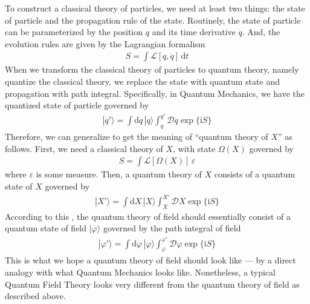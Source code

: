 \documentclass[letterpaper,10pt,english]{sphinxmanual}
\begin{document}
To construct a classical theory of particles, we need at least two things: the state of particle and the propagation rule of the state. Routinely, the state of particle can be parameterized by the position \(q\) and its time derivative \(\dot{q}\). And, the evolution rules are given by the Lagrangian formalism
\begin{equation*}
\begin{split}S = \int \mathcal{L}[q,\dot{q}]\,\mathrm{d}t\end{split}
\end{equation*}
When we transform the classical theory of particles to quantum theory, namely quantize the classical theory, we replace the state with quantum state and propagation with path integral. Specifically, in Quantum Mechanics, we have the quantized state of particle governed by
\begin{equation*}
\begin{split}|q'\rangle = \int\mathrm{d}q\,|q\rangle \int_q^{q'}\mathcal{D}q\exp\{\mathrm{i}S\}\end{split}
\end{equation*}
Therefore, we can generalize to get the meaning of ``quantum theory of \(X\)” as follows. First, we need a classical theory of \(X\), with state \(\Omega(X)\) governed by
\begin{equation*}
\begin{split}S = \int \mathcal{L}[\Omega(X)]\,\varepsilon\end{split}
\end{equation*}
where \(\varepsilon\) is some measure. Then, a quantum theory of \(X\) consists of a quantum state of \(X\) governed by
\begin{equation*}
\begin{split}|X'\rangle = \int\mathrm{d}X\,|X\rangle \int_X^{X'}\mathcal{D}X\exp\{\mathrm{i}S\}\end{split}
\end{equation*}
According to this , the quantum theory of field should essentially consist of a quantum state of field \(|\varphi\rangle\) governed by the path integral of field
\begin{equation*}
\begin{split}|\varphi'\rangle = \int\mathrm{d}\varphi\,|\varphi\rangle \int_\varphi^{\varphi'}\mathcal{D}\varphi\exp\{\mathrm{i}S\}\end{split}
\end{equation*}
This is what we hope a quantum theory of field should look like --- by a direct analogy with what Quantum Mechanics looks like. Nonetheless, a typical Quantum Field Theory looks very different from the quantum theory of field as described above.
\end{document}
